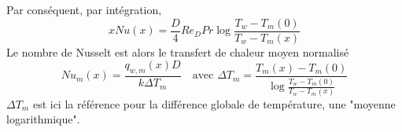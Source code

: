 \documentclass[a4paper,11pt]{report}
\begin{document}
      Par conséquent, par intégration,
      \begin{equation}
        x Nu(x) = \frac{D}{4} Re_D Pr \log\frac{T_w - T_m(0)}{T_w - T_m(x)}
      \end{equation}
      Le nombre de Nusselt est alors le transfert de chaleur moyen normalisé
      \begin{equation}
        Nu_m(x) = \frac{q_{w,m}(x) D}{k \Delta T_m} \quad \textrm{avec } \Delta T_m = \frac{T_m(x) - T_m(0)}{\log \frac{T_w - T_m(0)}{T_w - T_m(x)}}
      \end{equation}
      $\Delta T_m$ est ici la référence pour la différence globale de température, une "moyenne logarithmique".

      \begin{figure}[!h]
        \centering
        
      \end{figure}



\begin{appendix}
  
\end{appendix}
\end{document}
